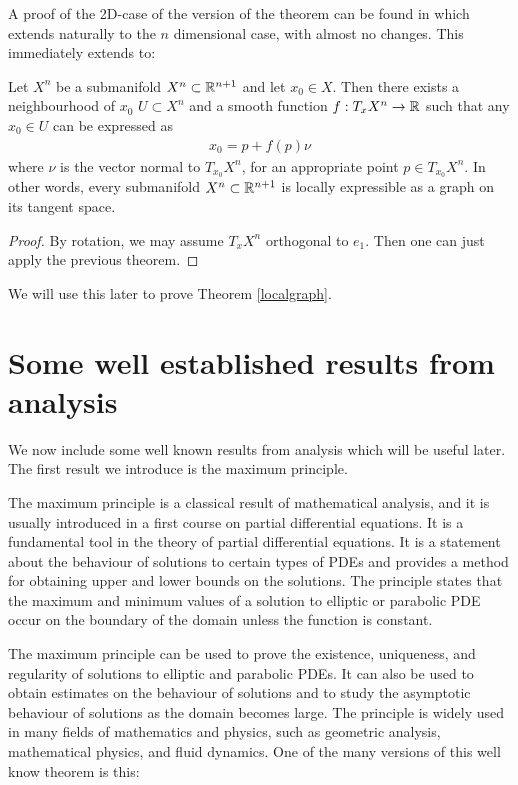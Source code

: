 A proof of the 2D-case of the version of the theorem can be found in \cite{DoCarmo} which extends naturally to the $n$ dimensional case, with almost no changes. This immediately extends to:

\begin{cor}
	Let $X^n$ be a submanifold $X^n\subset\mathbb{R}^{n+1}$ and let $x_0\in X$. Then there exists a neighbourhood of $x_0$ $U\subset X^n$ and a smooth function $f: T_x X^n\rightarrow \mathbb{R}$ such that any $x_0\in U$ can be expressed as \label{localgraphcorollary}
	\begin{align*}
		x_0= p + f(p) \nu 
	\end{align*}
	where $\nu$ is the vector normal to $T_{x_0} X^n$, for an appropriate point $p\in T_{x_0} X^n$. 
	In other words, every submanifold $X^n\subset\mathbb{R}^{n+1}$ is locally expressible as a graph on its tangent space. 
\end{cor}

\begin{proof}
	By rotation, we may assume $T_x X^n$ orthogonal to $e_1$. Then one can just apply the previous theorem. 
\end{proof}

We will use this later to prove Theorem \ref{localgraph}. 


\section{Some well established results from analysis}

We now include some well known results from analysis which will be useful later. The first result we introduce is the maximum principle.

The maximum principle is a classical result of mathematical analysis, and it is usually introduced in a first course on partial differential equations. It is a fundamental tool in the theory of partial differential equations. It is a statement about the behaviour of solutions to certain types of PDEs and provides a method for obtaining upper and lower bounds on the solutions. The principle states that the maximum and minimum values of a solution to elliptic or parabolic PDE occur on the boundary of the domain unless the function is constant. 

The maximum principle can be used to prove the existence, uniqueness, and regularity of solutions to elliptic and parabolic PDEs. It can also be used to obtain estimates on the behaviour of solutions and to study the asymptotic behaviour of solutions as the domain becomes large. The principle is widely used in many fields of mathematics and physics, such as geometric analysis, mathematical physics, and fluid dynamics. One of the many versions of this well know theorem is this: 

